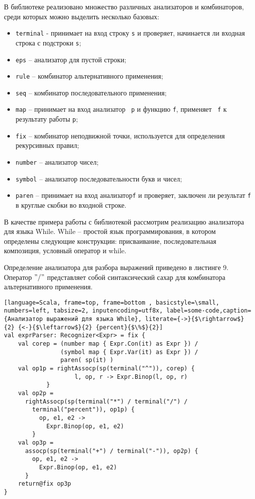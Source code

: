   В библиотеке реализовано множество различных анализаторов и комбинаторов, среди которых можно выделить несколько базовых:
  \begin{itemize}
      \item \lstinline[language=Scala]{terminal} - принимает на вход строку \lstinline[language=Scala]{s} и проверяет, начинается ли входная строка с подстроки \lstinline[language=Scala]{s};
      \item \lstinline[language=Scala]{eps} -- анализатор для пустой строки;
      \item \lstinline[language=Scala]{rule} -- комбинатор альтернативного применения;
      \item \lstinline[language=Scala]{seq} -- комбинатор последовательного применения;
      \item \lstinline[language=Scala]{map} -- принимает на вход анализатор \lstinline[language=Scala]{ p} и функцию \lstinline[language=Scala]{f}, применяет \lstinline[language=Scala]{ f} к результату работы \lstinline[language=Scala]{p};
      \item \lstinline[language=Scala]{fix} -- комбинатор неподвижной точки, используется для определения рекурсивных правил;
      \item \lstinline[language=Scala]{number} -- анализатор чисел;
      \item \lstinline[language=Scala]{symbol} -- анализатор последовательности букв и чисел;
      \item \lstinline[language=Scala]{paren} -- принимает на вход анализатор\lstinline[language=Scala]{f} и проверяет, заключен ли результат \lstinline[language=Scala]{f} в круглые скобки во входной строке.
  \end{itemize}
  
   В качестве примера работы с библиотекой рассмотрим реализацию анализатора для языка While. While -- простой язык программирования, в котором определены следующие конструкции: присваивание, последовательная композиция, условный оператор и while.
   
   Определение анализатора для разбора выражений приведено в листинге 9. Оператор $"/"$ представляет собой синтаксический сахар для комбинатора альтернативного применения. 
  
  \begin{lstlisting}[language=Scala, frame=top, frame=bottom , basicstyle=\small, numbers=left, tabsize=2, inputencoding=utf8x, label=some-code,caption={Анализатор выражений для языка While}, literate={->}{$\rightarrow$}{2} {<-}{$\leftarrow$}{2} {percent}{$\%$}{2}]
val exprParser: Recognizer<Expr> = fix {
    val corep = (number map { Expr.Con(it) as Expr }) /
                (symbol map { Expr.Var(it) as Expr }) /
                paren( sp(it) )
    val op1p = rightAssocp(sp(terminal("^")), corep) {
                    l, op, r -> Expr.Binop(l, op, r) 
            }
    val op2p =
      rightAssocp(sp(terminal("*") / terminal("/") / 
        terminal("percent")), op1p) {
          op, e1, e2 ->
            Expr.Binop(op, e1, e2)
        }
    val op3p =
      assocp(sp(terminal("+") / terminal("-")), op2p) {
        op, e1, e2 ->
          Expr.Binop(op, e1, e2)
      }
    return@fix op3p
}
  \end{lstlisting}
  
